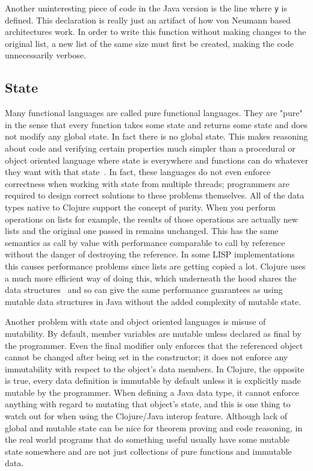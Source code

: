 Another uninteresting piece of code in the Java version is the line
where {\tt y} is defined. 
This declaration is really just an artifact of how von Neumann based
architectures work. 
In order to write this function without making changes to 
the original list, a new list of the same size must first be created, making the code unnecessarily verbose. 

\subsection{State}
Many functional languages are called pure functional languages. 
They are "pure" in the sense that every function takes some state and
returns some state and does not modify any global state. 
In fact there is no global state. 
This makes reasoning about code and verifying certain properties much
simpler than a procedural or object oriented language where state is
everywhere and functions can do whatever they want with that
state~\cite{process}. 
In fact, these languages do not even enforce correctness when working
with state from multiple threads; programmers are required to design
correct solutions to these problems themselves.
All of the data types native to Clojure support the concept of purity. 
When you perform operations on lists for example, the results of
 those operations are actually new lists and the original one passed
 in remains unchanged. 
This has the same semantics as call by value with performance
comparable to call by reference without the danger of destroying the
reference. 
In some LISP implementations this causes performance problems
since lists are getting copied a lot. 
Clojure uses a much more efficient way of doing this, which underneath the hood shares the data
structures~\cite{cljDataStructures} and so can give the same
performance guarantees as using mutable data structures in Java
without the added complexity of mutable state.
 
Another problem with state and object oriented languages is misuse of
mutability. 
By default, member variables are mutable unless declared as final by
the programmer. 
Even the final modifier only enforces that the referenced object
cannot be changed after being set in the constructor; it does not
enforce any immutability with respect to the object's data members. 
In Clojure, the opposite is true, every data definition is immutable
by default unless it is explicitly made mutable by the
programmer. 
When defining a Java data type, it cannot enforce anything with regard
to mutating that object's state, and this is one thing to watch out
for when using the Clojure/Java interop feature. 
Although lack of global and mutable state can be nice for theorem proving and code reasoning, in the real world programs that do something useful usually have some mutable state somewhere and are not just collections of pure functions and immutable data.  

